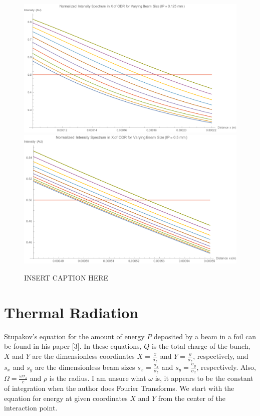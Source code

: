 \documentclass[12pt]{article}
\begin{document}
\begin{figure}
\begin{center}
\includegraphics[scale=0.5]{figures/ODR_Norm_IntensityX_125_zoom.PDF}
\includegraphics[scale=0.5]{figures/ODR_Norm_IntensityX_500_zoom.PDF}
\caption{INSERT CAPTION HERE}
\end{center}
\end{figure}





\section{Thermal Radiation}

Stupakov's equation for the amount of energy $P$ deposited by a beam in a foil can be found in his paper [3]. In these equations, $Q$ is the total charge of the bunch, $X$ and $Y$ are the dimensionless coordinates $X=\frac{x}{\sigma_z}$ and $Y=\frac{y}{\sigma_z}$, respectively, and $s_x$ and $s_y$ are the dimensionless beam sizes $s_x=\frac{\sigma_x}{\sigma_z}$ and $s_y=\frac{\sigma_y}{\sigma_z}$, respectively. Also, $\Omega=\frac{\omega \sigma_z}{c}$ and $\rho$ is the radius. I am unsure what $\omega$ is, it appears to be the constant of integration when the author does Fourier Transforms. We start with the equation for energy at given coordinates $X$ and $Y$ from the center of the interaction point.
\end{document}
